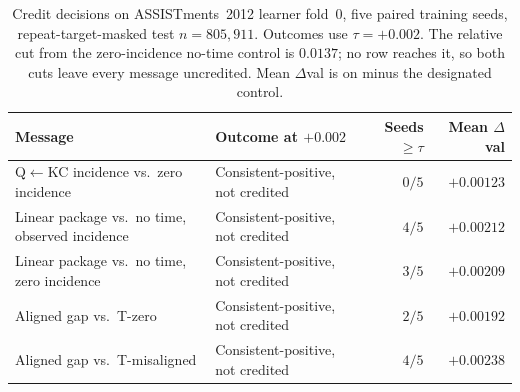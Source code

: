 \begin{table}[t]
\caption{Credit decisions on ASSISTments~2012 learner fold~0, five paired
training seeds, repeat-target-masked test $n{=}805{,}911$. Outcomes use
$\tau{=}{+}0.002$. The relative cut from the zero-incidence no-time
control is $0.0137$; no row reaches it, so both cuts leave every message
uncredited. Mean $\Delta$val is on minus the designated control.}
\label{tab:credit-assist}
\centering
\footnotesize
\setlength{\tabcolsep}{3pt}
\begin{tabularx}{\textwidth}{@{}>{\raggedright\arraybackslash}p{3.6cm}
>{\raggedright\arraybackslash}X
r r@{}}
\toprule
Message & Outcome at $+0.002$ & Seeds $\ge\tau$ & Mean $\Delta$val \\
\midrule
Q$\leftarrow$KC incidence vs.\ zero incidence &
Consistent-positive, not credited & $0/5$ & $+0.00123$ \\
Linear package vs.\ no time, observed incidence &
Consistent-positive, not credited & $4/5$ & $+0.00212$ \\
Linear package vs.\ no time, zero incidence &
Consistent-positive, not credited & $3/5$ & $+0.00209$ \\
Aligned gap vs.\ T-zero &
Consistent-positive, not credited & $2/5$ & $+0.00192$ \\
Aligned gap vs.\ T-misaligned &
Consistent-positive, not credited & $4/5$ & $+0.00238$ \\
\bottomrule
\end{tabularx}
\end{table}
